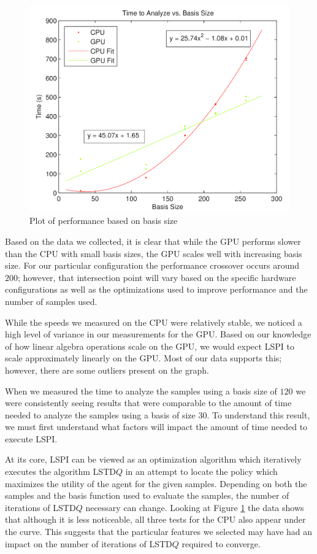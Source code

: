 \begin{figure}
    \centering
    \includegraphics[height=0.33\paperheight]{Time_vs_Basis.png}
    \caption{Plot of performance based on basis size}
    \label{fig:basis}
\end{figure}

Based on the data we collected, it is clear that while the GPU performs slower than the CPU with small basis sizes, the GPU scales well with increasing basis size. For our particular configuration the performance crossover occurs around $200$; however, that intersection point will vary based on the specific hardware configurations as well as the optimizations used to improve performance and the number of samples used.

While the speeds we measured on the CPU were relatively stable, we noticed a high level of variance in our measurements for the GPU. Based on our knowledge of how linear algebra operations scale on the GPU, we would expect LSPI to scale approximately linearly on the GPU. Most of our data supports this; however, there are some outliers present on the graph.

When we measured the time to analyze the samples using a basis size of $120$ we were consistently seeing results that were comparable to the amount of time needed to analyze the samples using a basis of size $30$. To understand this result, we must first understand what factors will impact the amount of time needed to execute LSPI.

At its core, LSPI can be viewed as an optimization algorithm which iteratively executes the algorithm LSTD$Q$ in an attempt to locate the policy which maximizes the utility of the agent for the given samples. Depending on both the samples and the basis function used to evaluate the samples, the number of iterations of LSTD$Q$ necessary can change. Looking at Figure \ref{fig:basis} the data shows that although it is less noticeable, all three tests for the CPU also appear under the curve. This suggests that the particular features we selected may have had an impact on the number of iterations of LSTD$Q$ required to converge.

